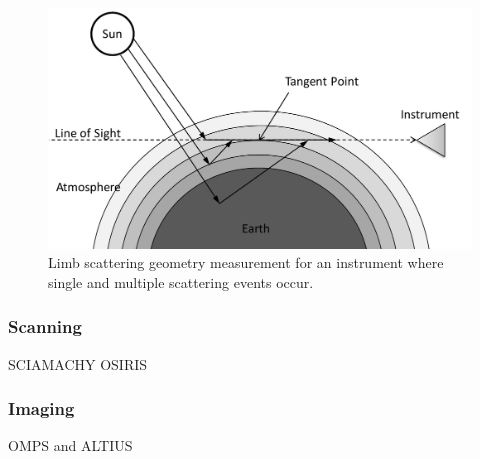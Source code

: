 \begin{figure}[h]
    \includegraphics[width=1.0\textwidth]{./Images/LimbScatterGeometry.pdf}
    \caption[Limb Scatter Geometry]{Limb scattering geometry measurement for an instrument where single and multiple scattering events occur.}
    \label{fig:LimbScatterGeometry}
\end{figure}

\subsubsection{Scanning}

SCIAMACHY OSIRIS

\subsubsection{Imaging}

OMPS and ALTIUS 